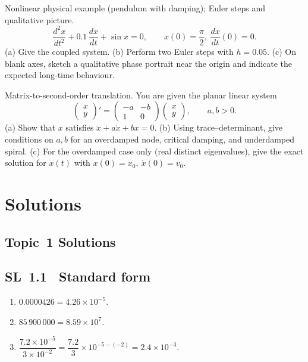 \documentclass[11pt]{article}
\def\textbf#1{#1}%
\newcommand{\tocsection}[1]{\section{#1}}
\newcommand{\tocsubsection}[1]{\subsection{#1}}
\newcounter{question}
\newcommand{\DisableQuestionHeader}{%
  \fancyhead{}%
}
\begin{document}
\begin{question}
\textbf{Nonlinear physical example (pendulum with damping); Euler steps and qualitative picture.}
\[
\frac{d^{2}x}{dt^{2}}+0.1\,\frac{dx}{dt}+\sin x=0,\qquad x(0)=\frac{\pi}{2},\ \frac{dx}{dt}(0)=0.
\]
(a) Give the coupled system.  
(b) Perform two Euler steps with \(h=0.05\).  
(c) On blank axes, sketch a qualitative phase portrait near the origin and indicate the expected long-time behaviour.
\begin{center}
\end{center}
\end{question}

\begin{question}
\textbf{Matrix-to-second-order translation.}
You are given the planar linear system
\[
\begin{pmatrix}x\\y\end{pmatrix}'=
\begin{pmatrix}-a&-b\\1&0\end{pmatrix}
\begin{pmatrix}x\\y\end{pmatrix},\qquad a,b>0.
\]
(a) Show that \(x\) satisfies \(\ddot x + a\dot x + b x=0\).  
(b) Using trace–determinant, give conditions on \(a,b\) for an overdamped node, critical damping, and underdamped spiral.  
(c) For the overdamped case only (real distinct eigenvalues), give the exact solution for \(x(t)\) with \(x(0)=x_0,\ \dot x(0)=v_0\).
\end{question}







\DisableQuestionHeader  %
\tocsection{Solutions}


\tocsubsection{Topic 1 Solutions}
\tocsubsection{SL 1.1 \; Standard form}
\begin{solution}
\begin{enumerate}[label=(\alph*)]
\item \(0.0000426 = 4.26\times 10^{-5}\).
\item \(85\,900\,000 = 8.59\times 10^{7}\).
\item \(\dfrac{7.2\times10^{-5}}{3\times10^{-2}} = \dfrac{7.2}{3}\times 10^{-5-(-2)} = 2.4\times 10^{-3}\).
\end{enumerate}
\end{solution}
\end{document}
